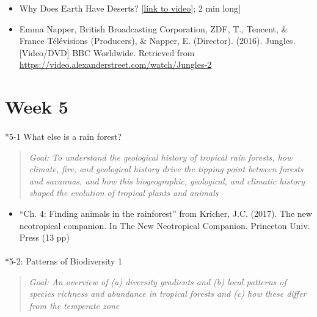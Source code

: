 \documentclass[
  10pt,
  letterpaper,
  oneside,
  open=any]{scrbook}
\makeatletter
\let\oldparagraph\paragraph
\renewcommand{\paragraph}{
    \@ifstar
      \xxxParagraphStar
      \xxxParagraphNoStar
  }
\newcommand{\xxxParagraphStar}[1]{\oldparagraph*{#1}\mbox{}}
\newcommand{\xxxParagraphNoStar}[1]{\oldparagraph{#1}\mbox{}}
\providecommand{\tightlist}{%
  \setlength{\itemsep}{0pt}\setlength{\parskip}{0pt}}
\makeatother
\begin{document}
\begin{itemize}
\item
  Why Does Earth Have Deserts?
  {[}\href{https://www.youtube.com/watch?v=T6Us1sPXBfA}{link to
  video}{]}; 2 min long{]}
\item
  Emma Napper, British Broadcasting Corporation, ZDF, T., Tencent, \&
  France Télévisions (Producers), \& Napper, E. (Director). (2016).
  Jungles. {[}Video/DVD{]} BBC Worldwide. Retrieved from
  \url{https://video.alexanderstreet.com/watch/Jungles-2}
\end{itemize}

\section*{Week 5}\label{week-5}


\paragraph*{5-1 What else is a rain
forest?}\label{what-else-is-a-rain-forest}

\begin{quote}
\emph{Goal: To understand the geological history of tropical rain
forests, how climate, fire, and geological history drive the tipping
point between forests and savannas, and how this biogeographic,
geological, and climatic history shaped the evolution of tropical plants
and animals}
\end{quote}

\begin{itemize}
\tightlist
\item
  ``Ch. 4: Finding animals in the rainforest'' from Kricher, J.C.
  (2017). The new neotropical companion. In The New Neotropical
  Companion. Princeton Univ. Press (13 pp)
\end{itemize}

\paragraph*{5-2: Patterns of Biodiversity
1}\label{patterns-of-biodiversity-1}

\begin{quote}
\emph{Goal: An overview of (a) diversity gradients and (b) local
patterns of species richness and abundance in tropical forests and (c)
how these differ from the temperate zone}
\end{quote}
\end{document}

